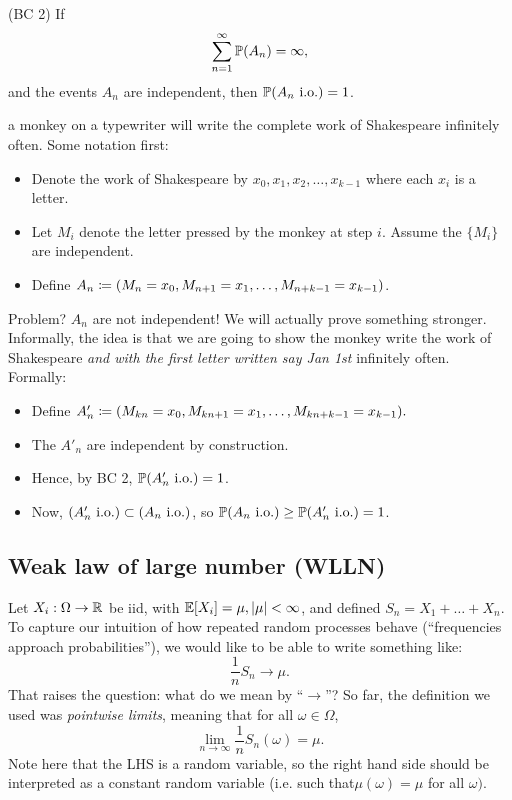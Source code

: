 \documentclass{article}
\begin{document}
 (BC 2) If \[ \sum_{n=1}^\infty \P(A_n) = \infty,\]and the events $A_n$ are independent, then $\P(A_n\io) = 1$.

 a monkey on a typewriter will write the complete work of Shakespeare infinitely often. Some notation first:
\begin{itemize}
  \item Denote the work of Shakespeare by $x_0, x_1, x_2, \dots, x_{k-1}$ where each $x_i$ is a letter.
  \item Let $M_i$ denote the letter pressed by the monkey at step $i$. Assume the $\{M_i\}$ are independent.
  \item Define $A_n \defeq (M_n = x_0, M_{n+1} = x_1, \dots, M_{n+k-1} = x_{k-1})$.
\end{itemize}
Problem? $A_n$ are not independent! We will actually prove something stronger. Informally, the idea is that we are going to show the monkey write the work of Shakespeare \emph{and with the first letter written say Jan 1st} infinitely often. Formally:
\begin{itemize}
  \item Define $A'_n \defeq (M_{kn} = x_0, M_{kn+1} = x_1, \dots, M_{kn+k-1} = x_{k-1}).$
  \item The $A'_n$ are independent by construction.
  \item Hence, by BC 2, $\P(A'_n \io) = 1$.
  \item Now, $(A'_n\io) \subset (A_n \io)$, so $\P(A_n \io) \ge \P(A'_n\io) = 1$.
\end{itemize} 


\subsection{Weak law of large number (WLLN)}

Let $X_i : \Omega \to \R$ be iid, with $\E[X_i] = \mu, |\mu| < \infty$, and defined $S_n = X_1 + \dots + X_n$. To capture our intuition of how repeated random processes behave (``frequencies approach probabilities''), we would like to be able to write something like: \[ \frac{1}{n} S_n \to \mu. \]That raises the question: what do we mean by ``$\to$''? So far, the definition we used was \emph{pointwise limits}, meaning that for all $\omega\in\Omega$, \[ \lim_{n\to\infty} \frac{1}{n} S_n(\omega) = \mu.\]Note here that the LHS is a random variable, so the right hand side should be interpreted as a constant random variable (i.e. such that$\mu(\omega) = \mu$ for all $\omega)$. 
\end{document}
